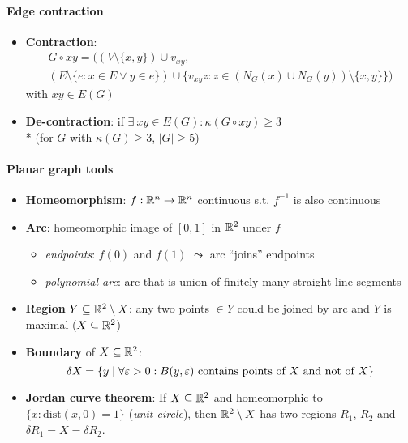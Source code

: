 \paragraph{Edge contraction}
\begin{itemize}
  \item \textbf{Contraction}:
  \begin{multline*}
    G \circ xy = ((V \setminus \{ x,y \}) \cup v_{xy}, \\
      (E \setminus \{ e: x \in E \vee y \in e \}) \cup \{ v_{xy}z : z \in (N_G(x) \cup N_G(y))\setminus \{ x,y \} \})
  \end{multline*}
  with $ xy \in E(G) $
  \item \textbf{De-contraction}: if $ \exists \ xy \in E(G) : \kappa(G \circ xy) \geq 3 $ \\*
    (for $ G $ with $ \kappa(G) \geq 3 $, $ \vert G \vert \geq 5 $) 
\end{itemize}

\paragraph{Planar graph tools}
\begin{itemize}
  \item \textbf{Homeomorphism}: $ f: \R^n \to \R^n $ continuous s.t. $ f^{-1} $ is also continuous 
  \item \textbf{Arc}: homeomorphic image of $ [0,1] $ in $ \R^2 $ under $ f $
  \begin{itemize}
    \item \emph{endpoints}: $ f(0) $ and $ f(1) $ $ \leadsto $ arc ``joins'' endpoints
    \item \emph{polynomial arc}: arc that is union of finitely many straight line segments
  \end{itemize}
  \item \textbf{Region} $ Y \subseteq \R^2 \setminus X $: any two points $ \in Y $ could be joined by arc and $ Y $ is maximal ($ X \subseteq \R^2 $)
  \item \textbf{Boundary} of $ X \subseteq \R^2 $:
    \begin{equation*}
      \delta X = \{ y \mid \forall \epsilon > 0 : B(y, \epsilon) \text{ contains points of $ X $ and not of $ X $} \}
    \end{equation*}
  \item \textbf{Jordan curve theorem}: If $ X \subseteq \R^2 $ and homeomorphic to $ \{ \overline{x} : \text{dist}(\overline{x}, 0) = 1 \} $ (\emph{unit circle}), then $ \R^2 \setminus X $ has two regions $ R_1 $, $ R_2 $ and $ \delta R_1 = X = \delta R_2 $.
\end{itemize}

